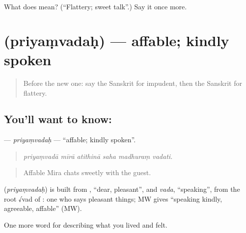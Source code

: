 \begin{tcolorbox}[breakable,colback=teal!4,colframe=teal!35!black,title={Before you move on}]
What does  mean? (\textquotedblleft{}Flattery; sweet talk\textquotedblright{}.) Say it once more.
\end{tcolorbox}
\section[\texorpdfstring{\sk{प्रियंवदः} (priyaṃvadaḥ)}{प्रियंवदः (priyaṃvadaḥ)}]{ (priyaṃvadaḥ) — affable; kindly spoken}

\label{lesson:SA-C467-priyamvadah}



\begin{quote}
Before the new one: say the Sanskrit for impudent, then the Sanskrit for flattery.
\end{quote}

\subsection*{You'll want to know: }
\textbf{} — \emph{priyaṃvadaḥ} — \textquotedblleft{}affable; kindly spoken\textquotedblright{}.

\begin{quote}
     
\end{quote}

\begin{quote}
\emph{priyaṃvadā mīrā atithinā saha madhuraṃ vadati.}
\end{quote}

\begin{quote}
Affable Mira chats sweetly with the guest.
\end{quote}

\begin{cousinweb}
\textbf{} (\emph{priyaṃvadaḥ}) is built from \textbf{}, \textquotedblleft{}dear, pleasant\textquotedblright{}, and \emph{vada}, \textquotedblleft{}speaking\textquotedblright{}, from the root √vad of \textbf{}: one who says pleasant things; MW gives \textquotedblleft{}speaking kindly, agreeable, affable\textquotedblright{} (MW).
\end{cousinweb}

\begin{grammarlens}[title={What you've built}]
One more word for describing what you lived and felt.
\end{grammarlens}

